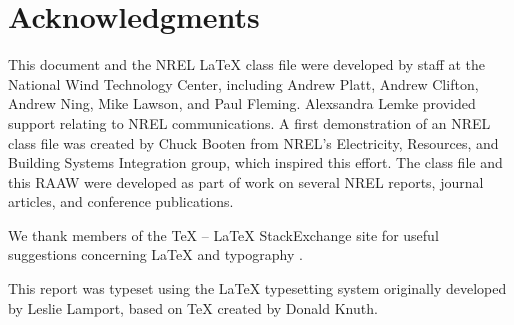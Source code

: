 \chapter*{Acknowledgments}
This document and the NREL LaTeX class file were developed by staff at the National Wind Technology Center, including Andrew Platt, Andrew Clifton, Andrew Ning, Mike Lawson, and Paul Fleming. Alexsandra Lemke provided support relating to NREL communications. A first demonstration of an NREL class file was created by Chuck Booten from NREL's Electricity, Resources, and Building Systems Integration group, which inspired this effort. The class file and this RAAW were developed as part of work on several NREL reports, journal articles, and conference publications. 

We thank members of the TeX -- LaTeX StackExchange site for useful suggestions concerning LaTeX and typography \citep{texstackexchange}.

This report was typeset using the LaTeX typesetting system originally developed by Leslie Lamport, based on TeX created by Donald Knuth.
